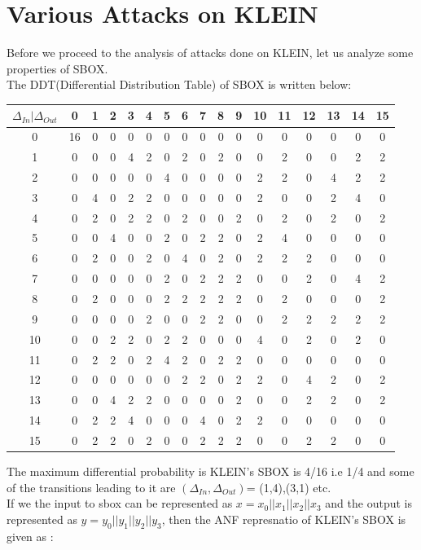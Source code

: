 \documentclass[preprint]{transcrypto}
\begin{document}
\section{Various Attacks on KLEIN}
Before we proceed to the analysis of attacks done on KLEIN, let us analyze some properties of SBOX.\\
The DDT(Differential Distribution Table) of SBOX is written below:
\begin{center}
\begin{tabular}{|c|c|c|c|c|c|c|c|c|c|c|c|c|c|c|c|c|}
\hline
$\Delta_{In}|\Delta_{Out}$ &0&1&2&3&4&5&6&7&8&9&10&11&12&13&14&15 \\
\hline
0&16& 0& 0& 0& 0& 0& 0& 0& 0& 0& 0& 0& 0& 0& 0& 0 \\
\hline
1&0& 0& 0& 4& 2& 0& 2& 0& 2& 0& 0& 2& 0& 0& 2& 2 \\
\hline
2&0& 0& 0& 0& 0& 4& 0& 0& 0& 0& 2& 2& 0& 4& 2& 2 \\
\hline
3&0& 4& 0& 2& 2& 0& 0& 0& 0& 0& 2& 0& 0& 2& 4& 0 \\
\hline
4&0& 2& 0& 2& 2& 0& 2& 0& 0& 2& 0& 2& 0& 2& 0& 2 \\
\hline
5&0& 0& 4& 0& 0& 2& 0& 2& 2& 0& 2& 4& 0& 0& 0& 0 \\
\hline
6&0& 2& 0& 0& 2& 0& 4& 0& 2& 0& 2& 2& 2& 0& 0& 0 \\
\hline
7&0& 0& 0& 0& 0& 2& 0& 2& 2& 2& 0& 0& 2& 0& 4& 2 \\
\hline
8&0& 2& 0& 0& 0& 2& 2& 2& 2& 2& 0& 2& 0& 0& 0& 2 \\
\hline
9&0& 0& 0& 0& 2& 0& 0& 2& 2& 0& 0& 2& 2& 2& 2& 2 \\
\hline
10&0& 0& 2& 2& 0& 2& 2& 0& 0& 0& 4& 0& 2& 0& 2& 0 \\
\hline
11&0& 2& 2& 0& 2& 4& 2& 0& 2& 2& 0& 0& 0& 0& 0& 0 \\
\hline
12&0& 0& 0& 0& 0& 0& 2& 2& 0& 2& 2& 0& 4& 2& 0& 2 \\
\hline
13&0& 0& 4& 2& 2& 0& 0& 0& 0& 2& 0& 0& 2& 2& 0& 2 \\
\hline
14&0& 2& 2& 4& 0& 0& 0& 4& 0& 2& 2& 0& 0& 0& 0& 0 \\
\hline
15&0& 2& 2& 0& 2& 0& 0& 2& 2& 2& 0& 0& 2& 2& 0& 0 \\
\hline
\end{tabular}
\end{center}
The maximum differential probability is KLEIN's SBOX is 4/16 i.e 1/4 and some of the transitions leading to it are $(\Delta_{In},\Delta_{Out})$= (1,4),(3,1) etc.\\
If we the input to sbox can be represented as $x=x_{0}||x_{1}||x_{2}||x_{3}$ and the output is represented as $y = y_{0}||y_{1}||y_{2}||y_{3}$, then the ANF represnatio of KLEIN's SBOX is given as :\\
\end{document}
